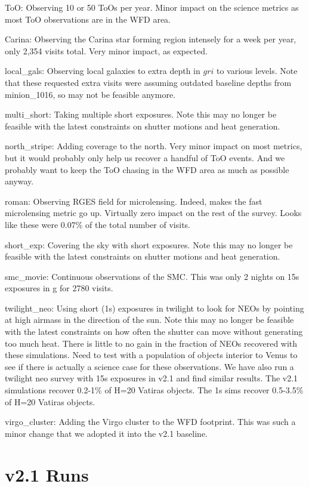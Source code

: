 ToO: Observing 10 or 50 ToOs per year. Minor impact on the science metrics as most ToO observations are in the WFD area.


Carina:  Observing the Carina star forming region intensely for a week per year, only 2,354 visits total.  Very minor impact, as expected.


local\_gals:  Observing local galaxies to extra depth in $gri$ to various levels. Note that these requested extra visits were assuming outdated baseline depths from minion\_1016, so may not be feasible anymore.

multi\_short:  Taking multiple short exposures. Note this may no longer be feasible with the latest constraints on shutter motions and heat generation.

north\_stripe:  Adding coverage to the north. Very minor impact on most metrics, but it would probably only help us recover a handful of ToO events. And we probably want to keep the ToO chasing in the WFD area as much as possible anyway.

roman: Observing RGES field for microlensing. Indeed, makes the fast microlensing metric go up. Virtually zero impact on the rest of the survey. Looks like these were 0.07\% of the total number of visits. 

short\_exp: Covering the sky with short exposures. Note this may no longer be feasible with the latest constraints on shutter motions and heat generation.

smc\_movie: Continuous observations of the SMC. This was only 2 nights on 15s exposures in g for 2780 visits. 

twilight\_neo:  Using short (1s) exposures in twilight to look for NEOs by pointing at high airmass in the direction of the sun. Note this may no longer be feasible with the latest constraints on how often the shutter can move without generating too much heat. There is little to no gain in the fraction of NEOs recovered with these simulations. Need to test with a population of objects interior to Venus to see if there is actually a science case for these observations.  We have also run a twilight neo survey with 15s exposures in v2.1 and find similar results. The v2.1 simulations recover 0.2-1\% of H=20 Vatiras objects. The 1s sims recover 0.5-3.5\% of H=20 Vatiras objects.

virgo\_cluster:  Adding the Virgo cluster to the WFD footprint. This was such a minor change that we adopted it into the v2.1 baseline.


\section{v2.1 Runs}

